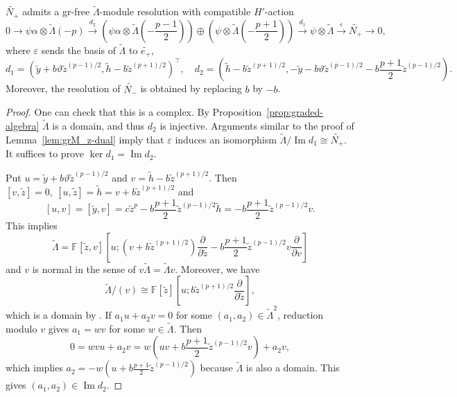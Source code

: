 \documentclass[11pt,a4paper]{article} %
\def\FF{\mathbb{F}}
\def\Im{\operatorname{Im}}
\begin{document}
\begin{lemma}\label{lem:N+-rsolution}
    $\widetilde{N_+}$ admits a gr-free $\widetilde{\Lambda}$-module resolution with compatible $H'$-action
    \begin{equation}\label{eq:N+-resolution}
        0\longrightarrow\psi\alpha\otimes\widetilde{\Lambda}(-p)\xrightarrow{\,d_2\,}\left(\psi\alpha\otimes\widetilde{\Lambda}(-\frac{p-1}{2})\right)\oplus\left(\psi\otimes\widetilde{\Lambda}(-\frac{p+1}{2})\right)\xrightarrow{d_1}\psi\otimes\widetilde{\Lambda}\xrightarrow{\,\varepsilon\,}\widetilde{N_+}\longrightarrow0,
    \end{equation}
    where $\varepsilon$ sends the basis of $\widetilde{\Lambda}$ to $\widetilde{e_+}$, 
    \[
    d_1=\left(\widetilde{y}+b\vartheta\widetilde{z}^{(p-1)/2},\widetilde{h}-b\widetilde{z}^{(p+1)/2}\right)^\top,\quad d_2=(\widetilde{h}-b\widetilde{z}^{(p+1)/2},-\widetilde{y}-b\vartheta\widetilde{z}^{(p-1)/2}-b\frac{p+1}{2}\widetilde{z}^{(p-1)/2}).
    \]
    Moreover, the resolution of $\widetilde{N_-}$ is obtained by replacing $b$ by $-b$.
\end{lemma}

\begin{proof}
    One can check that this is a complex. By Proposition~\ref{prop:graded-algebra} $\widetilde{\Lambda}$ is a domain, and thus $d_2$ is injective. Arguments similar to the proof of Lemma~\ref{lem:grM_z-dual} imply that $\varepsilon$ induces an isomorphism $\widetilde{\Lambda}/\Im d_1\cong\widetilde{
    N_+}$. It suffices to prove $\ker d_1=\Im d_2$.

    Put $u=\widetilde{y}+b\vartheta\widetilde{z}^{(p-1)/2}$ and $v=\widetilde{h}-b\widetilde{z}^{(p+1)/2}$. Then $[v,\widetilde{z}]=0,~[u,\widetilde{z}]=\widetilde{h}=v+b\widetilde{z}^{(p+1)/2}$ and 
    \[
    [u,v]=[\widetilde{y},v]=c\widetilde{z}^p-b\frac{p+1}{2}\widetilde{z}^{(p-1)/2}\widetilde{h}=-b\frac{p+1}{2}\widetilde{z}^{(p-1)/2}v.
    \]
    This implies 
    \[
    \widetilde{\Lambda}=\FF[\widetilde{z},v][u;(v+b\widetilde{z}^{(p+1)/2})\frac{\partial}{\partial\widetilde{z}}-b\frac{p+1}{2}\widetilde{z}^{(p-1)/2}v\frac{\partial}{\partial v}]
    \]
    and $v$ is normal in the sense of $v\widetilde{\Lambda}=\widetilde{\Lambda}v$. Moreover, we have 
    \[
    \widetilde{\Lambda}/(v)\cong\FF[\widetilde{z}][u;b\widetilde{z}^{(p+1)/2}\frac{\partial}{\partial\widetilde{z}}],
    \]
    which is a domain by \cite[Theorem 1.2.9]{MR01}. If $a_1u+a_2v=0$ for some $(a_1,a_2)\in\widetilde{\Lambda}^2$, reduction modulo $v$ gives $a_1=wv$ for some $w\in\widetilde{\Lambda}$. Then 
    \[
    0=wvu+a_2v=w(uv+b\frac{p+1}{2}\widetilde{z}^{(p-1)/2}v)+a_2v,
    \]
    which implies $a_2=-w(u+b\frac{p+1}{2}\widetilde{z}^{(p-1)/2})$ because $\widetilde{\Lambda}$ is also a domain. This gives $(a_1,a_2)\in\Im d_2$.
\end{proof}
\end{document}
